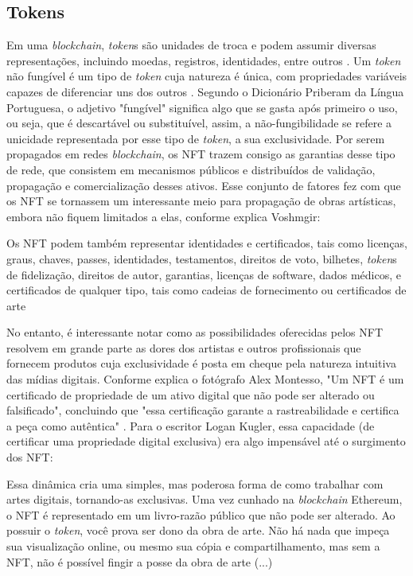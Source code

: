 \subsection{Tokens}
\label{subsec: tokens}
Em uma \textit{blockchain}, \textit{token}s são unidades de troca e podem assumir diversas representações, incluindo moedas, registros, identidades, entre outros \cite{Antonopoulos, Voshmgir}. Um \textit{token} não fungível é um tipo de \textit{token} cuja natureza é única, com propriedades variáveis capazes de diferenciar uns dos outros \cite{Voshmgir}. Segundo o Dicionário Priberam da Língua Portuguesa, o adjetivo "fungível" significa algo que se gasta após primeiro o uso, ou seja, que é descartável ou substituível, assim, a não-fungibilidade se refere a unicidade representada por esse tipo de \textit{token}, a sua exclusividade. Por serem propagados em redes \textit{blockchain}, os NFT trazem consigo as garantias desse tipo de rede, que consistem em mecanismos públicos e distribuídos de validação, propagação e comercialização desses ativos. Esse conjunto de fatores fez com que os NFT se tornassem um interessante meio para propagação de obras artísticas, embora não fiquem limitados a elas, conforme explica Voshmgir:

\begin{citacao}
	 Os NFT podem também representar identidades e certificados, tais como licenças, graus, chaves, passes, identidades, testamentos, direitos de voto, bilhetes, \textit{token}s de fidelização, direitos de autor, garantias, licenças de software, dados médicos, e certificados de qualquer tipo, tais como cadeias de fornecimento ou certificados de arte \cite{Voshmgir}
\end{citacao}

No entanto, é interessante notar como as possibilidades oferecidas pelos NFT resolvem em grande parte as dores dos artistas e outros profissionais que fornecem produtos cuja exclusividade é posta em cheque pela natureza intuitiva das mídias digitais. Conforme explica o fotógrafo Alex Montesso, "Um NFT é um certificado de propriedade de um ativo digital que não pode ser alterado ou falsificado", concluindo que "essa certificação garante a rastreabilidade e certifica a peça como autêntica" \cite{Montesso}. Para o escritor Logan Kugler, essa capacidade (de certificar uma propriedade digital exclusiva) era algo impensável até o surgimento dos NFT: 

\begin{citacao}
Essa dinâmica cria uma simples, mas poderosa forma de como trabalhar com artes digitais, tornando-as exclusivas. Uma vez cunhado na \textit{blockchain} Ethereum, o NFT é representado em um livro-razão público que não pode ser alterado. Ao possuir o \textit{token}, você prova ser dono da obra de arte. Não há nada que impeça sua visualização online, ou mesmo sua cópia e compartilhamento, mas sem a NFT, não é possível fingir a posse da obra de arte (...) \cite{Kugler}
\end{citacao}

